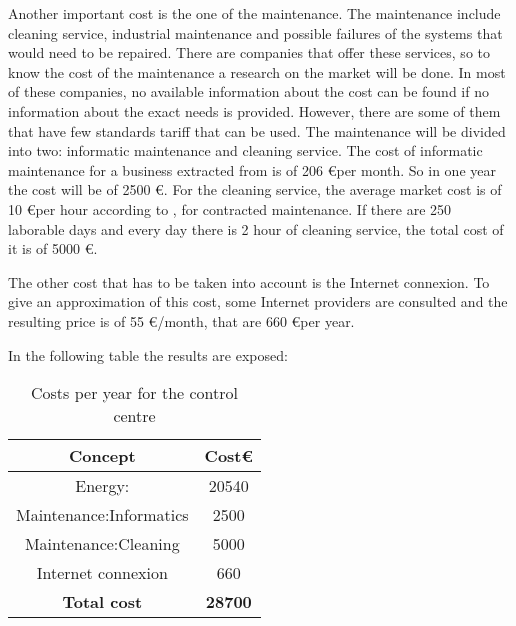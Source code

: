 Another important cost is the one of the maintenance. The maintenance include cleaning service, industrial maintenance and possible failures of the systems that would need to be repaired. There are companies that offer these services, so to know the cost of the maintenance a research on the market will be done. In most of these companies, no available information about the cost can be found if no information about the exact needs is provided. However, there are some of them that have few standards tariff that can be used. The maintenance will be divided into two: informatic maintenance and cleaning service. The cost of informatic maintenance for a business extracted from \cite{inf} is of 206 \euro per month. So in one year the cost will be of 2500 \euro. For the cleaning service, the average market cost is of 10 \euro per hour according to \cite{clean}, for contracted maintenance. If there are 250 laborable days and every day there is 2 hour of cleaning service, the total cost of it is of 5000 \euro.

The other cost that has to be taken into account is the Internet connexion. To give an approximation of this cost, some Internet providers are consulted and the resulting price is of 55 \euro /month, that are 660 \euro per year.

In the following table the results are exposed:
\begin{table}[H]
\begin{center}
\begin{tabular}{|c|c|}
\hline
\textbf{Concept}&\textbf{Cost\euro}\\
\hline
Energy:&20540\\
\hline
Maintenance:Informatics&2500\\
\hline
Maintenance:Cleaning&5000\\
\hline
Internet connexion&660\\
\hline
\textbf{Total cost}&\textbf{28700}\\
\hline
\end{tabular}
\caption{Costs per year for the control centre}
\end{center}
\end{table}

